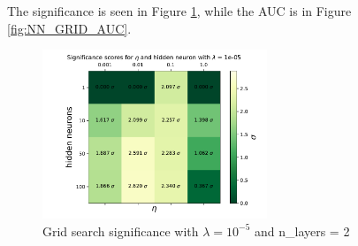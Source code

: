 \documentclass[14pt, a4paper]{book}
\begin{document}
The significance is seen in Figure \ref{fig:NN_GRID_SIG}, while the AUC is in Figure \ref{fig:NN_GRID_AUC}.\\
\graphicspath{{../../../Plots/NeuralNetwork/FULL/GRID_lamda_eta_neurons}}
\begin{figure}[!ht]
      \centering
      \includegraphics[width=0.6\textwidth]{Significance_ne.pdf}
      \caption{Grid search significance with $\lambda=10^{-5}$ and n\_layers = 2}\label{fig:NN_GRID_SIG}
\end{figure}
\graphicspath{{../../../Plots/NeuralNetwork/FULL/GRID_lamda_eta_neurons/AUC}}
\end{document}
